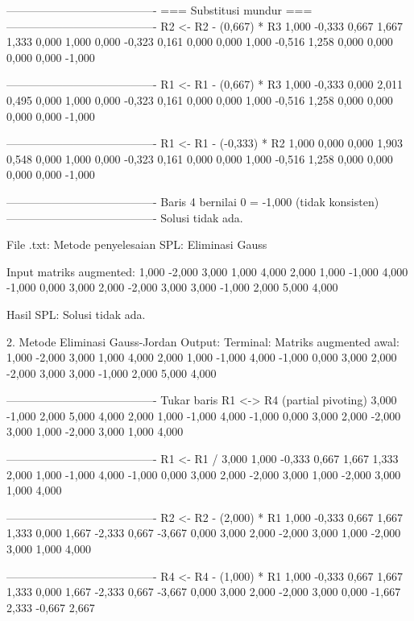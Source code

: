 \documentclass[12pt]{article}
\begin{document}
\begin{enumerate}
\begin{keluaran}
----------------------------------------
=== Substitusi mundur ===
----------------------------------------
R2 <- R2 - (0,667) * R3
1,000   -0,333  0,667   1,667   1,333
0,000   1,000   0,000   -0,323  0,161
0,000   0,000   1,000   -0,516  1,258
0,000   0,000   0,000   0,000   -1,000

----------------------------------------
R1 <- R1 - (0,667) * R3
1,000   -0,333  0,000   2,011   0,495
0,000   1,000   0,000   -0,323  0,161
0,000   0,000   1,000   -0,516  1,258
0,000   0,000   0,000   0,000   -1,000

----------------------------------------
R1 <- R1 - (-0,333) * R2
1,000   0,000   0,000   1,903   0,548
0,000   1,000   0,000   -0,323  0,161
0,000   0,000   1,000   -0,516  1,258
0,000   0,000   0,000   0,000   -1,000

----------------------------------------
Baris 4 bernilai 0 = -1,000 (tidak konsisten)
----------------------------------------
Solusi tidak ada.

File .txt:
Metode penyelesaian SPL: Eliminasi Gauss

Input matriks augmented:
1,000	-2,000	3,000	1,000	4,000
2,000	1,000	-1,000	4,000	-1,000
0,000	3,000	2,000	-2,000	3,000
3,000	-1,000	2,000	5,000	4,000

Hasil SPL:
Solusi tidak ada.

2. Metode Eliminasi Gauss-Jordan
Output:
Terminal:
Matriks augmented awal:
1,000   -2,000  3,000   1,000   4,000
2,000   1,000   -1,000  4,000   -1,000
0,000   3,000   2,000   -2,000  3,000
3,000   -1,000  2,000   5,000   4,000

----------------------------------------
Tukar baris R1 <-> R4 (partial pivoting)
3,000   -1,000  2,000   5,000   4,000
2,000   1,000   -1,000  4,000   -1,000
0,000   3,000   2,000   -2,000  3,000
1,000   -2,000  3,000   1,000   4,000

----------------------------------------
R1 <- R1 / 3,000
1,000   -0,333  0,667   1,667   1,333
2,000   1,000   -1,000  4,000   -1,000
0,000   3,000   2,000   -2,000  3,000
1,000   -2,000  3,000   1,000   4,000

----------------------------------------
R2 <- R2 - (2,000) * R1
1,000   -0,333  0,667   1,667   1,333
0,000   1,667   -2,333  0,667   -3,667
0,000   3,000   2,000   -2,000  3,000
1,000   -2,000  3,000   1,000   4,000

----------------------------------------
R4 <- R4 - (1,000) * R1
1,000   -0,333  0,667   1,667   1,333
0,000   1,667   -2,333  0,667   -3,667
0,000   3,000   2,000   -2,000  3,000
0,000   -1,667  2,333   -0,667  2,667


\end{keluaran}
\end{enumerate}
\end{document}
